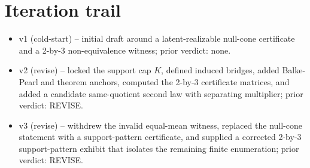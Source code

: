 \documentclass[11pt]{article}
\theoremstyle{definition}
\theoremstyle{plain}
\theoremstyle{remark}
\begin{document}
\section{Iteration trail}
\begin{itemize}[leftmargin=*]
\item v1 (cold-start) -- initial draft around a latent-realizable null-cone certificate and a 2-by-3 non-equivalence witness; prior verdict: none.
\item v2 (revise) -- locked the support cap \(K\), defined induced bridges, added Balke-Pearl and theorem anchors, computed the 2-by-3 certificate matrices, and added a candidate same-quotient second law with separating multiplier; prior verdict: REVISE.
\item v3 (revise) -- withdrew the invalid equal-mean witness, replaced the null-cone statement with a support-pattern certificate, and supplied a corrected 2-by-3 support-pattern exhibit that isolates the remaining finite enumeration; prior verdict: REVISE.
\end{itemize}
\end{document}
